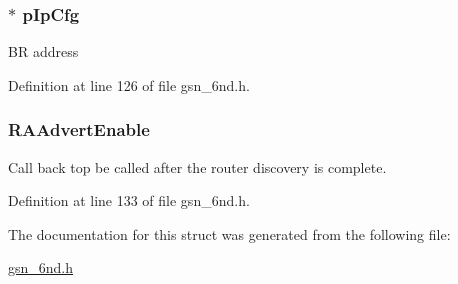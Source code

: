 \hypertarget{a00193_aee20ba6a350c363c484ef6f95a001753}{
\subsubsection[{pIpCfg}]{$\ast$ {\bf pIpCfg}}}
\label{a00193_aee20ba6a350c363c484ef6f95a001753}
BR address 

Definition at line 126 of file gsn\_\-6nd.h.

\hypertarget{a00193_a775fba1092bccc056e88151dc1547f8f}{
\subsubsection[{RAAdvertEnable}]{ {\bf RAAdvertEnable}}}
\label{a00193_a775fba1092bccc056e88151dc1547f8f}
Call back top be called after the router discovery is complete. 

Definition at line 133 of file gsn\_\-6nd.h.



The documentation for this struct was generated from the following file:\begin{DoxyCompactItemize}
\item 
\hyperlink{a00473}{gsn\_\-6nd.h}\end{DoxyCompactItemize}
